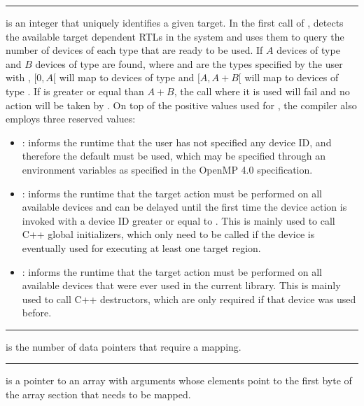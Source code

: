 \noindent\rule{\textwidth}{0.4pt}

 is an integer that uniquely identifies a given target. In the first call of , \libomptarget{} detects the available target dependent RTLs in the system and uses them to query the number of devices of each type that are ready to be used. If $A$ devices of type  and $B$ devices of type  are found, where  and  are the types specified by the user with ,  $[0,A[$ will map to devices of type  and  $[A,A+B[$ will map to devices of type . If  is greater or equal than $A+B$, the call where it is used will fail and no action will be taken by \libomptarget{}. On top of the positive values used for , the compiler also employs three reserved values:

\begin{itemize}
  \item {}: informs the runtime that the user has not specified any device ID, and therefore the default must be used, which may be specified through an environment variables as specified in the OpenMP 4.0 specification.

  \item {}: informs the runtime that the target action must be performed on all available devices and can be delayed until the first time the device action is invoked with a device ID greater or equal to . This is mainly used to call C++ global initializers, which only need to be called if the device is eventually used for executing at least one target region.

  \item {}: informs the runtime that the target action must be performed on all available devices that were ever used in the current library. This is mainly used to call C++ destructors, which are only required if that device was used before.
\end{itemize}

\noindent\rule{\textwidth}{0.4pt}

 is the number of data pointers that require a mapping.

\noindent\rule{\textwidth}{0.4pt}

 is a pointer to an array with  arguments whose elements point to the first byte of the array section that needs to be mapped.

